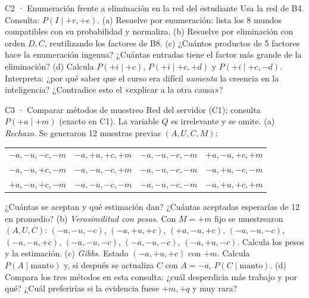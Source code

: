 \begin{ejercicio}{C2 · Enumeración frente a eliminación en la red del estudiante }
Usa la red de B4. Consulta: $P(I\mid+r,+e)$.
(a)  Resuelve por enumeración: lista los 8 mundos compatibles con su probabilidad y normaliza.
(b)  Resuelve por eliminación con orden $D,C$, reutilizando los factores de B8.
(c)  ¿Cuántos productos de 5 factores hace la enumeración ingenua? ¿Cuántas entradas tiene el factor más grande de la eliminación?
(d)  Calcula $P(+i\mid+c)$, $P(+i\mid+c,+d)$ y $P(+i\mid+c,-d)$. Interpreta: ¿por qué saber que el curso era difícil
\emph{aumenta} la creencia en la inteligencia? ¿Contradice esto el «explicar a la otra causa»?
\end{ejercicio}

\begin{ejercicio}{C3 · Comparar métodos de muestreo }
Red del servidor (C1); consulta $P(+a\mid+m)$ (exacto en C1). La variable $Q$ es irrelevante y se omite.
(a)  \emph{Rechazo.} Se generaron 12 muestras previas $(A,U,C,M)$:
\begin{center}\small
\begin{tabular}{llll}
$-a,-u,-c,-m$ & $-a,+u,+c,+m$ & $-a,-u,-c,-m$ & $+a,-u,+c,+m$\\
$-a,-u,+c,-m$ & $-a,-u,-c,+m$ & $-a,-u,-c,-m$ & $-a,+u,-c,-m$\\
$+a,-u,+c,-m$ & $-a,-u,-c,-m$ & $-a,-u,-c,-m$ & $-a,+u,+c,+m$
\end{tabular}
\end{center}
¿Cuántas se aceptan y qué estimación dan? ¿Cuántas aceptadas esperarías de 12 en promedio?
(b)  \emph{Verosimilitud con pesos.} Con $M=+m$ fijo se muestrearon $(A,U,C)$:
$(-a,-u,-c)$, $(-a,+u,+c)$, $(+a,-u,+c)$, $(-a,-u,-c)$, $(-a,-u,+c)$, $(-a,-u,-c)$, $(-a,-u,-c)$, $(-a,+u,-c)$.
Calcula los pesos y la estimación.
(c)  \emph{Gibbs.} Estado $(-a,+u,+c)$ con $+m$. Calcula $P(A\mid\text{manto})$ y, si después se actualiza $C$ con $A=-a$, $P(C\mid\text{manto})$.
(d)  Compara los tres métodos en esta consulta: ¿cuál desperdicia más trabajo y por qué? ¿Cuál preferirías si la evidencia fuese $+m,+q$ y muy rara?
\end{ejercicio}


